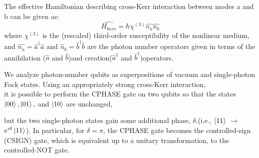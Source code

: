 \documentclass{article}
\begin{document}
 The effective Hamiltonian describing cross-Kerr interaction between modes a and b can be given as:
 $$ \hat{H_{kerr}}=\hbar\chi^(3)\hat{n_a}\hat{n_b} $$
 where $\chi^(3) $ is the (rescaled) third-order susceptibility of the nonlinear medium,
 and $\hat{n_a}=\hat{a}^{\dagger}\hat{a}$ and $\hat{n}_b=\hat{b}^{\dagger}\hat{b}$ are the photon number operators
 given in terms of the annihilation ($\hat{a}$ and $\hat{b}$)and creation($\hat{a}^{\dagger}$ and $\hat{b}^{\dagger}$)operators.

 We analyze photon-number qubits as superpositions of vacuum and single-photon Fock states.
 Using an appropriately strong cross-Kerr interaction,
 \\ it is possible to perform the CPHASE gate on two qubits
 so that the states $\ket{00},\ket{01},$ and $\ket{10}$ are unchanged,
 
 but the two single-photon states gain some additional phase, $\delta$.(i.e., $\ket{11}$ $\rightarrow$ $e^{i\delta}\ket{11}$).
 In particular, for $\delta=\pi$, the CPHASE gate becomes the controlled-sign (CSIGN) gate,
 which is equivalent up to a unitary transformation, to the controlled-NOT gate.
\end{document}
